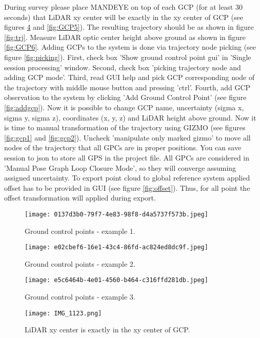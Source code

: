 During survey please place MANDEYE on top of each GCP (for at least 30 seconds) that LiDAR xy center will be exactly in the xy center of GCP (see figures \ref{fig:GCP4} and \ref{fig:GCP5}).
The resulting trajectory should be as shown in figure \ref{fig:trj}.
Measure LiDAR optic center height above ground as shown in figure \ref{fig:GCP6}.
Adding GCPs to the system is done via trajectory node picking (see figure \ref{fig:picking}).
First, check box 'Show ground control point gui' in 'Single session processing' window.
Second, check box 'picking trajectory node and adding GCP mode'.
Third, read GUI help and pick GCP corresponding node of the trajectory with middle mouse button and pressing 'ctrl'.
Fourth, add GCP observation to the system by clicking 'Add Ground Control Point' (see figure \ref{fig:addgcp}).
Now it is possible to change GCP name, uncertainty (sigma x, sigma y, sigma z), coordinates (x, y, z) and LiDAR height above ground.
Now it is time to manual transformation of the trajectory using GIZMO (see figures \ref{fig:gcp1} and \ref{fig:gcp2}). 
Uncheck 'manipulate only marked gizmo' to move all nodes of the trajectory that all GPCs are in proper positions.
You can save session to json to store all GPS in the project file.
All GPCs are considered in 'Manual Pose Graph Loop Closure Mode', so they will converge assuming assigned uncertainty. 
To export point cloud to global reference system applied offset has to be provided in GUI (see figure \ref{fig:offset}).
Thus, for all point the offset transformation will applied during export.

\begin{figure}[H]
	\centering
	\texttt{[image: 0137d3b0-79f7-4e83-98f8-d4a5737f573b.jpeg]}
	\caption{Ground control points - example 1.}
	\label{fig:GCP1}
\end{figure}

\begin{figure}[H]
	\centering
	\texttt{[image: e02cbef6-16e1-43c4-86fd-ac824ed8dc9f.jpeg]}
	\caption{Ground control points - example 2.}
	\label{fig:GCP2}
\end{figure}

\begin{figure}[H]
	\centering
	\texttt{[image: e5c6464b-4e01-4560-b464-c316ffd281db.jpeg]}
	\caption{Ground control points - example 3.}
	\label{fig:GCP3}
\end{figure}




\begin{figure}[H]
	\centering
	\texttt{[image: IMG\_1123.png]}
	\caption{LiDAR xy center is exactly in the xy center of GCP.}
	\label{fig:GCP4}
\end{figure}

